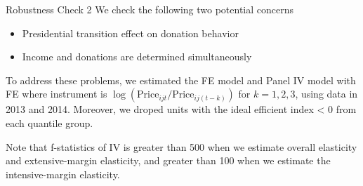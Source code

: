 \documentclass[
  ignorenonframetext,
]{beamer}
\providecommand{\tightlist}{%
  \setlength{\itemsep}{0pt}\setlength{\parskip}{0pt}}
\begin{document}
\begin{frame}{Robustness Check 2}
\protect\hypertarget{robustness-check-2-2}{}
We check the following two potential concerns

\begin{itemize}
\tightlist
\item
  Presidential transition effect on donation behavior
\item
  Income and donations are determined simultaneously
\end{itemize}

To address these problems, we estimated the FE model and Panel IV model with FE where instrument is \(\log(\text{Price}_{ijt}/\text{Price}_{ij(t-k)})\) for \(k = 1, 2, 3\), using data in 2013 and 2014.
Moreover, we droped units with the ideal efficient index \textless{} 0 from each quantile group.

Note that f-statistics of IV is greater than 500 when we estimate overall elasticity and extensive-margin elasticity, and greater than 100 when we estimate the intensive-margin elasticity.
\end{frame}
\end{document}
